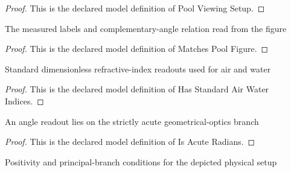 \begin{proof}
  This is the declared model definition of Pool Viewing Setup.
\end{proof}
\begin{definition}
  \label{def:physics:phyx-mini-0145:phyxminiproblems-problemphyxmini0145-matchespoolfigure}
  The measured labels and complementary-angle relation read from the figure
\end{definition}
\begin{proof}
  This is the declared model definition of Matches Pool Figure.
\end{proof}
\begin{definition}
  \label{def:physics:phyx-mini-0145:phyxminiproblems-problemphyxmini0145-hasstandardairwaterindices}
  Standard dimensionless refractive-index readouts used for air and water
\end{definition}
\begin{proof}
  This is the declared model definition of Has Standard Air Water Indices.
\end{proof}
\begin{definition}
  \label{def:physics:phyx-mini-0145:phyxminiproblems-problemphyxmini0145-isacuteradians}
  An angle readout lies on the strictly acute geometrical-optics branch
\end{definition}
\begin{proof}
  This is the declared model definition of Is Acute Radians.
\end{proof}
\begin{definition}
  \label{def:physics:phyx-mini-0145:phyxminiproblems-problemphyxmini0145-hasphysicalpoolviewingparameters}
  Positivity and principal-branch conditions for the depicted physical setup
\end{definition}
